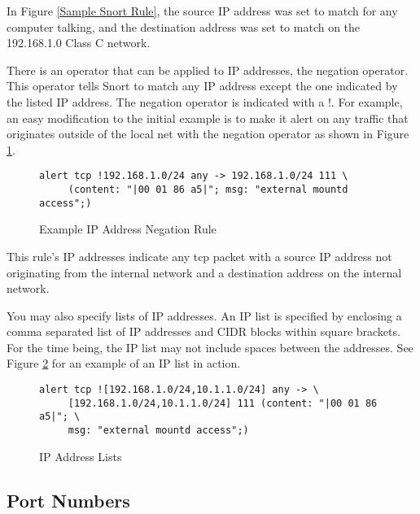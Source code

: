 \documentclass[english]{report}
\begin{document}
In Figure \ref{Sample Snort Rule}, the source IP address was set
to match for any computer talking, and the destination address was
set to match on the 192.168.1.0 Class C network.

There is an operator that can be applied to IP addresses, the negation
operator. This operator tells Snort to match any IP address except
the one indicated by the listed IP address. The negation operator
is indicated with a !. For example, an easy modification
to the initial example is to make it alert on any traffic that originates
outside of the local net with the negation operator as shown in Figure
\ref{Example Negation}.

\begin{center}
\begin{figure}[!hbpt]
\begin{verbatim}
alert tcp !192.168.1.0/24 any -> 192.168.1.0/24 111 \
     (content: "|00 01 86 a5|"; msg: "external mountd access";)
\end{verbatim}

\caption{\label{Example Negation} Example IP Address Negation Rule}
\end{figure}
\end{center}


This rule's IP addresses indicate any tcp packet with a
source IP address not originating from the internal network and a
destination address on the internal network.

You may also specify lists of IP addresses. An IP list is specified
by enclosing a comma separated list of IP addresses and CIDR blocks
within square brackets. For the time being, the IP list may not include
spaces between the addresses. See Figure \ref{IP list usage} for
an example of an IP list in action.

\begin{center}
\begin{figure}[!hbpt]
\begin{verbatim}
alert tcp ![192.168.1.0/24,10.1.1.0/24] any -> \
     [192.168.1.0/24,10.1.1.0/24] 111 (content: "|00 01 86 a5|"; \
     msg: "external mountd access";)
\end{verbatim}

\caption{\label{IP list usage}IP Address Lists}
\end{figure}
\end{center}



\subsection{Port Numbers}
\end{document}
